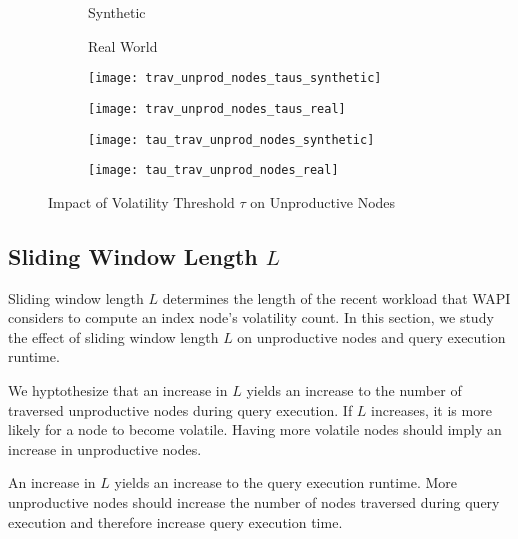 \documentclass[abstracton,12pt]{scrartcl}
\theoremstyle{definition}
\begin{document}
\begin{figure}[h]
  \centering
  \begin{subfigure}{0.49\linewidth}
    \centering
    Synthetic
  \end{subfigure}
  \begin{subfigure}{0.49\linewidth}
    \centering
    Real World
  \end{subfigure}
  \begin{subfigure}{0.49\linewidth}
    \centering
    \texttt{[image: trav\_unprod\_nodes\_taus\_synthetic]}
    \caption{}
    \label{fig:trav_unprod_nodes_taus_synthetic}
  \end{subfigure}
  \begin{subfigure}{0.49\linewidth}
    \centering
    \texttt{[image: trav\_unprod\_nodes\_taus\_real]}
    \caption{}
    \label{fig:trav_unprod_nodes_taus_real}
  \end{subfigure}
  \begin{subfigure}{0.49\linewidth}
    \centering
    \texttt{[image: tau\_trav\_unprod\_nodes\_synthetic]}
    \caption{}
    \label{fig:tau_trav_unprod_nodes_synthetic}
  \end{subfigure}
  \begin{subfigure}{0.49\linewidth}
    \centering
    \texttt{[image: tau\_trav\_unprod\_nodes\_real]}
    \caption{}
    \label{fig:tau_trav_unprod_nodes_real}
  \end{subfigure}
  \caption{Impact of Volatility Threshold $\tau$ on Unproductive Nodes}
\end{figure}

\subsection{Sliding Window Length $L$}

Sliding window length $L$ determines the length of the recent workload that WAPI
considers to compute an index node's volatility count. In this section, we study
the effect of sliding window length $L$ on unproductive nodes and query
execution runtime.

We hyptothesize that an increase in $L$ yields an increase to the number of
traversed unproductive nodes during query execution. If $L$ increases, it is
more likely for a node to become volatile. Having more volatile nodes should
imply an increase in unproductive nodes.

An increase in $L$ yields an increase to the query execution runtime. More
unproductive nodes should increase the number of nodes traversed
during query execution and therefore increase query execution time.
\end{document}
